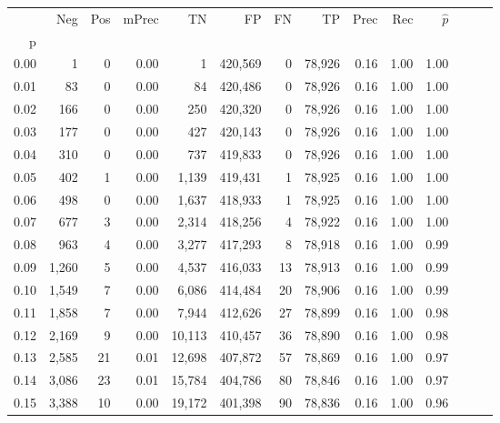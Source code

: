 \begin{tabular}{rrrrrrrrrrrrrr}
\toprule
{} &    Neg &    Pos & mPrec &       TN &       FP &      FN &      TP &  Prec &   Rec & $\hat{p}$ \\
p    &        &        &       &          &          &         &         &       &       &           \\
\midrule
0.00 &      1 &      0 &  0.00 &        1 &  420,569 &       0 &  78,926 &  0.16 &  1.00 &      1.00 \\
0.01 &     83 &      0 &  0.00 &       84 &  420,486 &       0 &  78,926 &  0.16 &  1.00 &      1.00 \\
0.02 &    166 &      0 &  0.00 &      250 &  420,320 &       0 &  78,926 &  0.16 &  1.00 &      1.00 \\
0.03 &    177 &      0 &  0.00 &      427 &  420,143 &       0 &  78,926 &  0.16 &  1.00 &      1.00 \\
0.04 &    310 &      0 &  0.00 &      737 &  419,833 &       0 &  78,926 &  0.16 &  1.00 &      1.00 \\
0.05 &    402 &      1 &  0.00 &    1,139 &  419,431 &       1 &  78,925 &  0.16 &  1.00 &      1.00 \\
0.06 &    498 &      0 &  0.00 &    1,637 &  418,933 &       1 &  78,925 &  0.16 &  1.00 &      1.00 \\
0.07 &    677 &      3 &  0.00 &    2,314 &  418,256 &       4 &  78,922 &  0.16 &  1.00 &      1.00 \\
0.08 &    963 &      4 &  0.00 &    3,277 &  417,293 &       8 &  78,918 &  0.16 &  1.00 &      0.99 \\
0.09 &  1,260 &      5 &  0.00 &    4,537 &  416,033 &      13 &  78,913 &  0.16 &  1.00 &      0.99 \\
0.10 &  1,549 &      7 &  0.00 &    6,086 &  414,484 &      20 &  78,906 &  0.16 &  1.00 &      0.99 \\
0.11 &  1,858 &      7 &  0.00 &    7,944 &  412,626 &      27 &  78,899 &  0.16 &  1.00 &      0.98 \\
0.12 &  2,169 &      9 &  0.00 &   10,113 &  410,457 &      36 &  78,890 &  0.16 &  1.00 &      0.98 \\
0.13 &  2,585 &     21 &  0.01 &   12,698 &  407,872 &      57 &  78,869 &  0.16 &  1.00 &      0.97 \\
0.14 &  3,086 &     23 &  0.01 &   15,784 &  404,786 &      80 &  78,846 &  0.16 &  1.00 &      0.97 \\
0.15 &  3,388 &     10 &  0.00 &   19,172 &  401,398 &      90 &  78,836 &  0.16 &  1.00 &      0.96 \\

\end{tabular}
